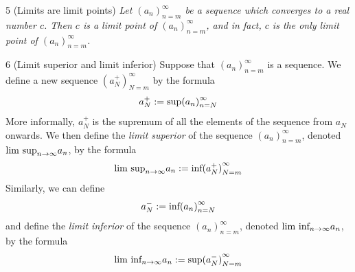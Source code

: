 \begin{proposition}{5}
    \label{limits-are-limit-points}
    (Limits are limit points) \emph{Let $(a_n)_{n=m}^{\infty}$ be a sequence which
    converges to a real number $c$. Then $c$ is a limit point of $(a_n)_{n=m}^{\infty}$,
    and in fact, $c$ is the only limit point of $(a_n)_{n=m}^{\infty}$.}
\end{proposition}

\begin{definition}{6}
    \label{limsup-liminf}
    (Limit superior and limit inferior) Suppose that $(a_n)_{n=m}^{\infty}$ is a
    sequence. We define a new sequence $(a_N^+)_{N=m}^{\infty}$ by the formula
    \begin{equation*}
        a_N^+ := \text{sup}{(a_n)}_{n=N}^{\infty}
    \end{equation*}
    More informally, $a_N^+$ is the supremum of all the elements of the sequence
    from $a_N$ onwards. We then define the \emph{limit superior} of the sequence
    $(a_n)_{n=m}^{\infty}$, denoted $\text{lim sup}_{n \rightarrow \infty}{a_n}$, by the formula
    \begin{equation*}
        \text{lim sup}_{n \rightarrow \infty}{a_n} := \text{inf}{(a_N^+)}_{N=m}^{\infty}
    \end{equation*}
    Similarly, we can define
    \begin{equation*}
        a_N^- := \text{inf}{(a_n)}_{n=N}^{\infty}
    \end{equation*}
    and define the \emph{limit inferior} of the sequence $(a_n)_{n=m}^{\infty}$,
    denoted $\text{lim inf}_{n \rightarrow \infty}{a_n}$, by the formula
    \begin{equation*}
        \text{lim inf}_{n \rightarrow \infty}{a_n} := \text{sup}{(a_N^-)}_{N=m}^{\infty}
    \end{equation*}
\end{definition}

